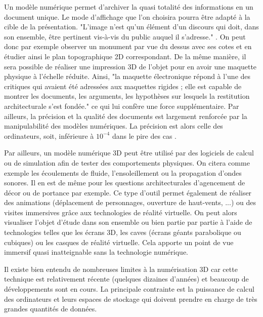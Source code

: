 		Un modèle numérique permet d'archiver la quasi totalité des informations en un document unique. Le mode d'affichage que l'on choisira pourra être adapté à la cible de la présentation. "L’image n’est qu’un élément d’un discours qui doit, dans son ensemble, être pertinent vis-à-vis du public auquel il s’adresse." \cite[p. 20]{golvin}. On peut donc par exemple observer un monument par vue du dessus avec ses cotes et en étudier ainsi le plan topographique 2D correspondant. De la même manière, il sera possible de réaliser une impression 3D de l'objet pour en avoir une maquette physique à l'échelle réduite. Ainsi, "la maquette électronique répond à l’une des critiques qui avaient été adressées aux maquettes rigides ; elle est capable de montrer les documents, les arguments, les hypothèses sur lesquels la restitution architecturale s’est fondée." \cite[p. 26]{golvin} ce qui lui confère une force supplémentaire. Par ailleurs, la précision et la qualité des documents est largement renforcée par la manipulabilité des modèles numériques. La précision est alors celle des ordinateurs, soit, inférieure à $10^{-4}$ dans le pire des cas \cite[Tableau : Valeur pour les unités matérielles standard d'arithmétique à virgule flottante]{precisionmachine}. 
		 
		 Par ailleurs, un modèle numérique 3D peut être utilisé par des logiciels de calcul ou de simulation afin de tester des comportements physiques. On citera comme exemple les écoulements de fluide, l'ensoleillement ou la propagation d'ondes sonores. Il en est de même pour les questions architecturales d'agencement de décor ou de portance par exemple. Ce type d'outil permet également de réaliser des animations (déplacement de personnages, ouverture de haut-vents, ...) ou des visites immersives grâce aux technologies de réalité virtuelle. On peut alors visualiser l'objet d'étude dans son ensemble ou bien partie par partie à l'aide de technologies telles que les écrans 3D, les caves (écrans géants parabolique ou cubiques) ou les casques de réalité virtuelle. Cela apporte un point de vue immersif quasi inatteignable sans la technologie numérique.
		 
Il existe bien entendu de nombreuses limites à la numérisation 3D car cette technique est relativement récente (quelques dizaines d'années) et beaucoup de développements sont en cours. La principale contrainte est la puissance de calcul des ordinateurs et leurs espaces de stockage qui doivent prendre en charge de très grandes quantités de données.

